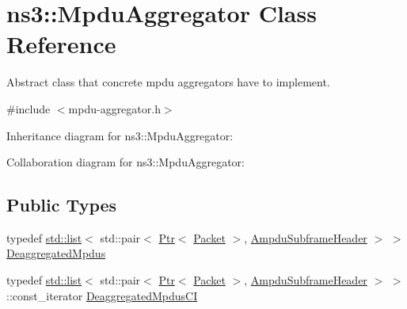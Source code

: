 \hypertarget{classns3_1_1MpduAggregator}{}\section{ns3\+:\+:Mpdu\+Aggregator Class Reference}
\label{classns3_1_1MpduAggregator}


Abstract class that concrete mpdu aggregators have to implement.  




{\ttfamily \#include $<$mpdu-\/aggregator.\+h$>$}



Inheritance diagram for ns3\+:\+:Mpdu\+Aggregator\+:


Collaboration diagram for ns3\+:\+:Mpdu\+Aggregator\+:
\subsection*{Public Types}
\begin{DoxyCompactItemize}
\item 
typedef \hyperlink{openflow-interface_8h_afd9bcfa176617760671b67580f536fa7}{std\+::list}$<$ std\+::pair$<$ \hyperlink{classns3_1_1Ptr}{Ptr}$<$ \hyperlink{classns3_1_1Packet}{Packet} $>$, \hyperlink{classns3_1_1AmpduSubframeHeader}{Ampdu\+Subframe\+Header} $>$ $>$ \hyperlink{classns3_1_1MpduAggregator_a09f3b03cb988045c381fad4ba4dce371}{Deaggregated\+Mpdus}
\item 
typedef \hyperlink{openflow-interface_8h_afd9bcfa176617760671b67580f536fa7}{std\+::list}$<$ std\+::pair$<$ \hyperlink{classns3_1_1Ptr}{Ptr}$<$ \hyperlink{classns3_1_1Packet}{Packet} $>$, \hyperlink{classns3_1_1AmpduSubframeHeader}{Ampdu\+Subframe\+Header} $>$ $>$\+::const\+\_\+iterator \hyperlink{classns3_1_1MpduAggregator_a14d8750e18f3104d3c87930f3bcb10a3}{Deaggregated\+Mpdus\+CI}
\end{DoxyCompactItemize}

